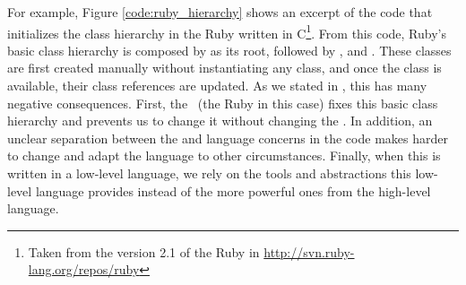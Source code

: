 For example, Figure \ref{code:ruby_hierarchy} shows an excerpt of the code that initializes the class hierarchy in the Ruby \VM written in C\footnote{Taken from the version 2.1 of the Ruby \VM in \url{http://svn.ruby-lang.org/repos/ruby}}. From this code, Ruby's basic class hierarchy is composed by  as its root, followed by ,  and . These classes are first created manually without instantiating any class, and once the class  is available, their class references are updated. As we stated in , this has many negative consequences. First, the \VM~(the Ruby \VM in this case) fixes this basic class hierarchy and prevents us to change it without changing the \VM.
In addition, an unclear separation between the \VM and language concerns in the \VM code makes harder to change and adapt the language to other circumstances. Finally, when this \VM is written in a low-level language, we rely on the tools and abstractions this low-level language provides instead of the more powerful ones from the high-level language. 




